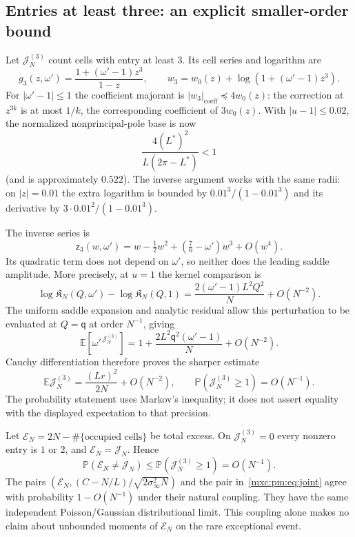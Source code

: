 \documentclass[11pt]{article}
\numberwithin{equation}{section}
\theoremstyle{definition}
\theoremstyle{remark}
\newcommand{\E}{\mathbb E}
\newcommand{\Pp}{\mathbb P}
\begin{document}
\subsection{Entries at least three: an explicit smaller-order bound}
Let $\mathcal J^{(3)}_N$ count cells with entry at least $3$. Its cell series
and logarithm are
\[
 g_3(z,\omega')=\frac{1+(\omega'-1)z^3}{1-z},\qquad
 w_3=w_0(z)+\log(1+(\omega'-1)z^3).
\]
For $|\omega'-1|\le1$ the coefficient majorant is
$|w_3|_{\mathrm{coeff}}\preceq4w_0(z)$: the correction at $z^{3k}$ is at most
$1/k$, the corresponding coefficient of $3w_0(z)$. With $|u-1|\le0.02$, the
normalized nonprincipal-pole base is now
\[
 \frac{4(L^*)^2}{L(2\pi-L^*)}<1
\]
(and is approximately $0.522$). The inverse argument works with the same
radii: on $|z|=0.01$ the extra logarithm is bounded by
$0.01^3/(1-0.01^3)$ and its derivative by $3\cdot0.01^2/(1-0.01^3)$.

The inverse series is
\[
 \mathsf z_3(w,\omega')=w-\tfrac12w^2+(\tfrac76-\omega')w^3+O(w^4).
\]
Its quadratic term does not depend on $\omega'$, so neither does the leading
saddle amplitude. More precisely, at $u=1$ the kernel comparison is
\[
 \log\mathfrak K_N(Q,\omega')-\log\mathfrak K_N(Q,1)
     =\frac{2(\omega'-1)L^2Q^2}{N}+O(N^{-2}).
\]
The uniform saddle expansion and analytic residual allow this perturbation to
be evaluated at $Q=\mathsf q$ at order $N^{-1}$, giving
\begin{equation}\label{mxc:pm:eq:triplepgf}
 \E[\omega'^{\,\mathcal J^{(3)}_N}]
     =1+\frac{2L^2\mathsf q^2(\omega'-1)}N+O(N^{-2}).
\end{equation}
Cauchy differentiation therefore proves the sharper estimate
\begin{equation}\label{mxc:pm:eq:triples}
 \E \mathcal J^{(3)}_N=\frac{(Lr)^2}{2N}+O(N^{-2}),\qquad
 \Pp(\mathcal J^{(3)}_N\ge1)=O(N^{-1}).
\end{equation}
The probability statement uses Markov's inequality; it does not assert
equality with the displayed expectation to that precision.

Let $\mathcal E_N=2N-\#\{\text{occupied cells}\}$ be total excess. On
$\mathcal J^{(3)}_N=0$ every nonzero entry is $1$ or $2$, and $\mathcal E_N=\mathcal J_N$.
Hence
\[
 \Pp(\mathcal E_N\ne \mathcal J_N)\le\Pp(\mathcal J^{(3)}_N\ge1)=O(N^{-1}).
\]
The pairs $(\mathcal E_N,(C-N/L)/\sqrt{2\sigma_\infty^2N})$ and the pair
in~\eqref{mxc:pm:eq:joint} agree with probability $1-O(N^{-1})$ under their
natural coupling. They have the same independent Poisson/Gaussian
distributional limit. This coupling alone makes no claim about unbounded
moments of $\mathcal E_N$ on the rare exceptional event.
\end{document}
